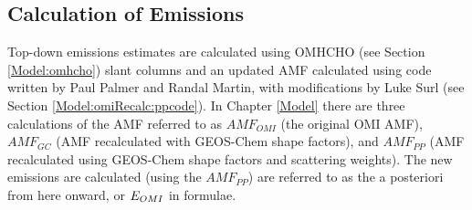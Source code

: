     
    
    
  \subsection{Calculation of Emissions}
    \label{BioIsop:method:calculation}
   
    Top-down emissions estimates are calculated using OMHCHO (see Section \ref{Model:omhcho}) slant columns and an updated AMF calculated using code written by Paul Palmer and Randal Martin, with modifications by Luke Surl (see Section \ref{Model:omiRecalc:ppcode}).
    In Chapter \ref{Model} there are three calculations of the AMF referred to as $AMF_{OMI}$ (the original OMI AMF), $AMF_{GC}$ (AMF recalculated with GEOS-Chem shape factors), and $AMF_{PP}$ (AMF recalculated using GEOS-Chem shape factors and scattering weights).
    The new emissions are calculated (using the $AMF_{PP}$) are referred to as the a posteriori from here onward, or $E_{OMI}$ in formulae.
    
